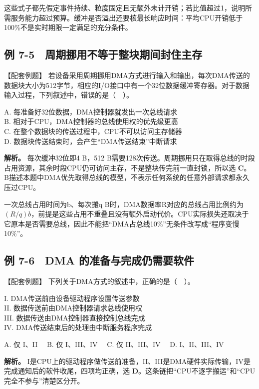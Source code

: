 这些式子都先假定事件持续、粒度固定且无额外未计开销；若比值超过1，说明所需服务能力超过预算。缓冲是否溢出还要核最长响应时间：平均CPU开销低于100\%不是实时期限一定满足的充分条件。

\subsection{例 7-5　周期挪用不等于整块期间封住主存}\label{CO07-example-5}

【配套例题】 若设备采用周期挪用DMA方式进行输入和输出，每次DMA传送的数据块大小为512字节，相应的I/O接口中有一个32位数据缓冲寄存器。对于数据输入过程，下列叙述中，错误的是（　）。

A. 每准备好32位数据，DMA控制器就发出一次总线请求\\
B. 相对于CPU，DMA控制器的总线使用权的优先级更高\\
C. 在整个数据块的传送过程中，CPU不可以访问主存储器\\
D. 数据块传送结束时，会产生``DMA传送结束''中断请求

\textbf{解析。} 每次缓冲32位即4 B，512 B需要128次传送。周期挪用只在取得总线的时段占用资源，其余时段CPU仍可访问主存，不是整块传完前一直封锁，所以选 \textbf{C}。B描述本题中DMA优先取得总线的模型，不表示任何系统的任意外部请求都永久压过CPU。

一次总线占用时间为b、每次搬q B时，DMA数据率R对应的总线占用比例约为 \((R/q)b\)，前提是这些占用不重叠且没有额外启动代价。CPU实际损失还取决于它原本是否需要总线，因此不能把``DMA占总线10\%''无条件改写成``程序变慢10\%''。

\subsection{例 7-6　DMA 的准备与完成仍需要软件}\label{CO07-example-6}

【配套例题】 下列关于DMA方式的叙述中，正确的是（　）。

I. DMA传送前由设备驱动程序设置传送参数\\
II. 数据传送前由DMA控制器请求总线使用权\\
III. 数据传送由DMA控制器直接控制总线完成\\
IV. DMA传送结束后的处理由中断服务程序完成

A. 仅 I、II　 B. 仅 I、III、IV　 C. 仅 II、III、IV　 D. I、II、III、IV

\textbf{解析。} I是CPU上的驱动程序做传送前准备，II、III是DMA硬件实际传输，IV是完成通知后的软件收尾，四项均正确，选 \textbf{D}。这条链把``CPU不逐字搬运''和``CPU完全不参与''清楚区分开。

